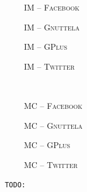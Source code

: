 \documentclass{article}
\newlength\figureheight
\newlength\figurewidth
\newcommand{\todo}[1]{\noindent\texttt{\small\color[rgb]{0.5,0.1,0.1} TODO: #1}}
\newcommand{\fbook}{\textsc{Facebook}}
\newcommand{\gnutella}{\textsc{Gnuttela}}
\newcommand{\gplus}{\textsc{GPlus}}
\newcommand{\twitter}{\textsc{Twitter}}
\newcommand{\infmax}{IM}
\newcommand{\maxcut}{MC}
\begin{document}
\setlength{}
\setlength{}
\newcommand{\subflen}{0.245\textwidth}
\newcommand{\scspacey}{-1.5em}
\newcommand{\scspacex}{0.5em}
\begin{figure}[tb]
  \begin{subfigure}[b]{\subflen}
    \centering
    
    \vspace{\scspacey}
    \caption{\hspace{\scspacex}\infmax{} -- \fbook}
    \label{fig:inf_ego_fb}
  \end{subfigure}
  \begin{subfigure}[b]{\subflen}
    
    \vspace{\scspacey}
    \caption{\hspace{\scspacex}\infmax{} -- \gnutella}
    \label{fig:inf_gnutella}
  \end{subfigure}
  \begin{subfigure}[b]{\subflen}
    
    \vspace{\scspacey}
    \caption{\hspace{\scspacex}\infmax{} -- \gplus}
    \label{fig:inf_gplus}
  \end{subfigure}
  \begin{subfigure}[b]{\subflen}
    
    \vspace{\scspacey}
    \caption{\hspace{\scspacex}\infmax{} -- \twitter}
    \label{fig:inf_twitter}
  \end{subfigure}\\[0.5em]
  \begin{subfigure}[b]{\subflen}
    
    \vspace{\scspacey}
    \caption{\hspace{\scspacex}\maxcut{} -- \fbook}
    \label{fig:mc_ego_fb}
  \end{subfigure}
  \begin{subfigure}[b]{\subflen}
    
    \vspace{\scspacey}
    \caption{\hspace{\scspacex}\maxcut{} -- \gnutella}
    \label{fig:mc_gnutella}
  \end{subfigure}
  \begin{subfigure}[b]{\subflen}
    
    \vspace{\scspacey}
    \caption{\hspace{\scspacex}\maxcut{} -- \gplus}
    \label{fig:mc_gplus}
  \end{subfigure}
  \begin{subfigure}[b]{\subflen}
    
    \vspace{\scspacey}
    \caption{\hspace{\scspacex}\maxcut{} -- \twitter}
    \label{fig:mc_twitter}
  \end{subfigure}
  \caption{
    \todo{}
  }
  \label{fig:exp}
\end{figure}
\end{document}
